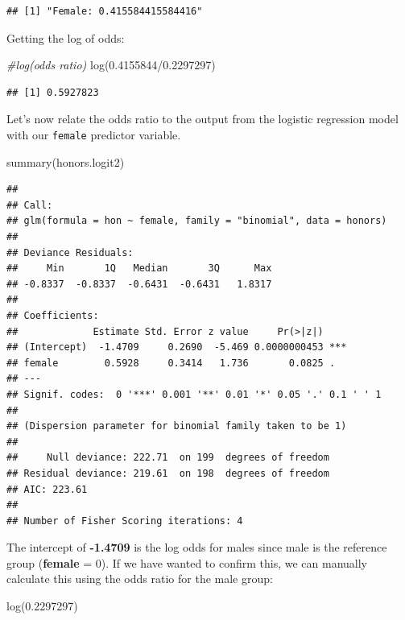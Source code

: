 \documentclass[
]{article}
\newenvironment{Shaded}{\begin{snugshade}}{\end{snugshade}}
\newcommand{\CommentTok}[1]{\textcolor[rgb]{0.56,0.35,0.01}{\textit{#1}}}
\newcommand{\FloatTok}[1]{\textcolor[rgb]{0.00,0.00,0.81}{#1}}
\newcommand{\FunctionTok}[1]{\textcolor[rgb]{0.00,0.00,0.00}{#1}}
\newcommand{\NormalTok}[1]{#1}
\newcommand{\SpecialCharTok}[1]{\textcolor[rgb]{0.00,0.00,0.00}{#1}}
\begin{document}
\begin{verbatim}
## [1] "Female: 0.415584415584416"
\end{verbatim}

Getting the log of odds:

\begin{Shaded}
\begin{Highlighting}[]
\CommentTok{\#log(odds ratio)}
\FunctionTok{log}\NormalTok{(}\FloatTok{0.4155844}\SpecialCharTok{/}\FloatTok{0.2297297}\NormalTok{)}
\end{Highlighting}
\end{Shaded}

\begin{verbatim}
## [1] 0.5927823
\end{verbatim}

Let's now relate the odds ratio to the output from the logistic
regression model with our \texttt{female} predictor variable.

\begin{Shaded}
\begin{Highlighting}[]
\FunctionTok{summary}\NormalTok{(honors.logit2)}
\end{Highlighting}
\end{Shaded}

\begin{verbatim}
## 
## Call:
## glm(formula = hon ~ female, family = "binomial", data = honors)
## 
## Deviance Residuals: 
##     Min       1Q   Median       3Q      Max  
## -0.8337  -0.8337  -0.6431  -0.6431   1.8317  
## 
## Coefficients:
##             Estimate Std. Error z value     Pr(>|z|)    
## (Intercept)  -1.4709     0.2690  -5.469 0.0000000453 ***
## female        0.5928     0.3414   1.736       0.0825 .  
## ---
## Signif. codes:  0 '***' 0.001 '**' 0.01 '*' 0.05 '.' 0.1 ' ' 1
## 
## (Dispersion parameter for binomial family taken to be 1)
## 
##     Null deviance: 222.71  on 199  degrees of freedom
## Residual deviance: 219.61  on 198  degrees of freedom
## AIC: 223.61
## 
## Number of Fisher Scoring iterations: 4
\end{verbatim}

The intercept of \textbf{-1.4709} is the log odds for males since male
is the reference group (\textbf{female} = 0). If we have wanted to
confirm this, we can manually calculate this using the odds ratio for
the male group:

\begin{Shaded}
\begin{Highlighting}[]
\FunctionTok{log}\NormalTok{(}\FloatTok{0.2297297}\NormalTok{)}
\end{Highlighting}
\end{Shaded}
\end{document}
